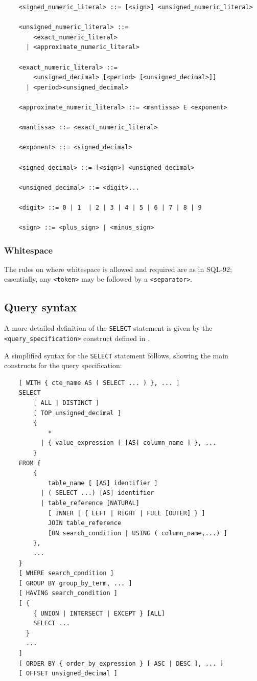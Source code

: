 \documentclass[11pt,a4paper]{ivoa}
\begin{document}
\begin{verbatim}
    <signed_numeric_literal> ::= [<sign>] <unsigned_numeric_literal>

    <unsigned_numeric_literal> ::=
        <exact_numeric_literal>
      | <approximate_numeric_literal>

    <exact_numeric_literal> ::=
        <unsigned_decimal> [<period> [<unsigned_decimal>]]
      | <period><unsigned_decimal>

    <approximate_numeric_literal> ::= <mantissa> E <exponent>

    <mantissa> ::= <exact_numeric_literal>

    <exponent> ::= <signed_decimal>

    <signed_decimal> ::= [<sign>] <unsigned_decimal>

    <unsigned_decimal> ::= <digit>...

    <digit> ::= 0 | 1  | 2 | 3 | 4 | 5 | 6 | 7 | 8 | 9

    <sign> ::= <plus_sign> | <minus_sign>
\end{verbatim}

\subsubsection{Whitespace}
\label{sec:whitespace}

The rules on where whitespace is allowed and required are as in SQL-92;
essentially, any \verb:<token>: may be followed by a \verb:<separator>:.

\clearpage %
\subsection{Query syntax}
\label{sec:syntax}

A more detailed definition of the \verb:SELECT: statement is given by the \verb:<query_specification>:
construct defined in .

A simplified syntax for the \verb:SELECT: statement follows, showing the main constructs for
the query specification:

\begin{verbatim}
    [ WITH { cte_name AS ( SELECT ... ) }, ... ]
    SELECT
        [ ALL | DISTINCT ]
        [ TOP unsigned_decimal ]
        {
            *
          | { value_expression [ [AS] column_name ] }, ...
        }
    FROM {
        {
            table_name [ [AS] identifier ]
          | ( SELECT ...) [AS] identifier
          | table_reference [NATURAL]
            [ INNER | { LEFT | RIGHT | FULL [OUTER] } ]
            JOIN table_reference
            [ON search_condition | USING ( column_name,...) ]
        },
        ...
    }
    [ WHERE search_condition ]
    [ GROUP BY group_by_term, ... ]
    [ HAVING search_condition ]
    [ {
        { UNION | INTERSECT | EXCEPT } [ALL]
        SELECT ...
      }
      ...
    ]
    [ ORDER BY { order_by_expression } [ ASC | DESC ], ... ]
    [ OFFSET unsigned_decimal ]
\end{verbatim}
\end{document}
